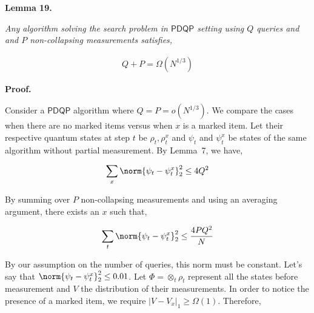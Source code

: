 \documentclass[10pt,a4paper]{article}
\begin{document}


\par\medskip\noindent\textbf{
\textbf{Lemma 19}\textbf{.}
}\par



\emph{Any algorithm solving the search problem in $\mathsf{PDQP}$ setting using $Q$ queries and and $P$ non-collapsing measurements satisfies,}\par


\[\begin{gathered}
\displaystyle Q+P=\Omega(N^{1/3})
\end{gathered}\]






\par\medskip\noindent\textbf{Proof.}\par




Consider a $\mathsf{PDQP}$ algorithm where $Q=P=o(N^{1/3})$. We compare the cases when there are no marked items versus when $x$ is a marked item. Let their respective quantum states at step $t$ be $\rho_{t},\rho_{t}^{x}$ and $\psi_{t}$ and $\psi_{t}^{x}$ be states of the same algorithm without partial measurement. By Lemma 7, we have,\par


\[\begin{gathered}
\displaystyle\sum_{x}\norm{\psi_{t}-\psi_{t}^{x}}^{2}_{2}\leq 4Q^{2}
\end{gathered}\]




By summing over $P$ non-collapsing measurements and using an averaging argument, there exists an $x$ such that,\par


\[\begin{gathered}
\displaystyle\sum_{t}\norm{\psi_{t}-\psi_{t}^{x}}^{2}_{2}\leq\frac{4PQ^{2}}{N}
\end{gathered}\]




By our assumption on the number of queries, this norm must be constant. Let’s say that $\norm{\psi_{t}-\psi_{t}^{x}}_{2}^{2}\leq 0.01$. Let $\Phi=\otimes_{t}\rho_{t}$ represent all the states before measurement and $V$ the distribution of their measurements. In order to notice the presence of a marked item, we require $|V-V_{x}|_{1}\geq\Omega(1)$. Therefore,\par
\end{document}
